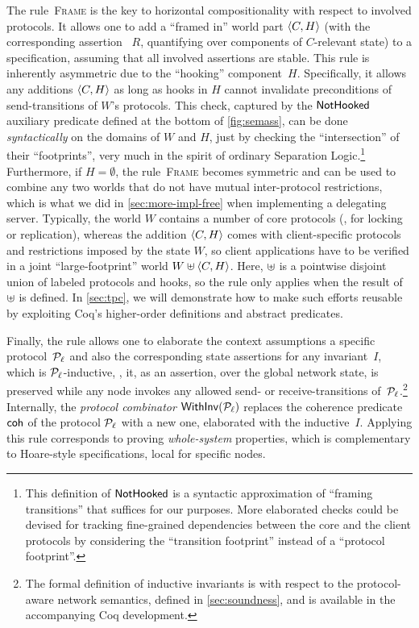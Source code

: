 The rule~\textsc{Frame} is the key to horizontal compositionality with
respect to involved protocols. It allows one to add a ``framed in''
world part $\langle{C, H}\rangle$ (with the corresponding assertion ~$R$,
quantifying over components of $C$-relevant state) to a specification,
assuming that all involved assertions are stable.
%
This rule is inherently asymmetric due to the ``hooking''
component~$H$. Specifically, it allows any additions $\langle{C, H}\rangle$
as long as hooks in $H$ cannot invalidate preconditions of
send-transitions of $W$'s protocols. This check, captured by the
$\mathsf{NotHooked}$ auxiliary predicate defined at the bottom of
\cref{fig:semass}, can be done \emph{syntactically} on the domains
of $W$ and $H$, just by checking the ``intersection'' of their
``footprints'', very much in the spirit of ordinary Separation
Logic.\footnote{This definition of $\mathsf{NotHooked}$ is a syntactic
  approximation of ``framing \wrt transitions'' that suffices for our
  purposes. More elaborated checks could be devised for tracking
  fine-grained dependencies between the core and the client protocols
  by considering the ``transition footprint'' instead of a ``protocol
  footprint''.}
%
Furthermore, if $H = \emptyset$, the rule~\textsc{Frame}
becomes symmetric and can be used to combine any two worlds that do
not have mutual inter-protocol restrictions, which is what we did in
\cref{sec:more-impl-free} when implementing a delegating
server.
%
Typically, the world $W$ contains a number of core protocols (\eg, for
locking or replication), whereas the addition $\langle{C, H}\rangle$ comes
with client-specific protocols and restrictions imposed by the state
\wrt $W$, so client applications have to be verified in a joint
``large-footprint'' world $W \uplus \langle{C, H}\rangle$. Here, $\uplus$ is a
pointwise disjoint union of labeled protocols and hooks, so the rule
only applies when the result of $\uplus$ is defined.
%
In \cref{sec:tpc}, we will demonstrate how to make such efforts
reusable by exploiting Coq's higher-order definitions and abstract
predicates.

Finally, the rule  allows one to elaborate the context
assumptions \wrt a specific protocol~$\mathcal{P}_\ell$ and also the
corresponding state assertions for any invariant~$I$, which is
$\mathcal{P}_\ell$-inductive, \ie, it, as an assertion, over the global
network state, is preserved while any node invokes any allowed send-
or receive-transitions of~$\mathcal{P}_\ell$.\footnote{The formal definition
  of inductive invariants is with respect to the protocol-aware
  network semantics, defined in \cref{sec:soundness}, and is
  available in the accompanying Coq development.}
%
Internally, the \emph{protocol combinator} $\mathsf{WithInv}(\mathcal{P}_\ell)$
replaces the coherence predicate $\mathsf{coh}$ of the protocol $\mathcal{P}_\ell$
with a new one, elaborated with the inductive~$I$.
%
Applying this rule corresponds to proving \emph{whole-system}
properties, which is complementary to Hoare-style specifications,
local for specific nodes.

